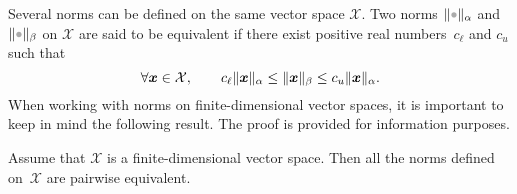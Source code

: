 Several norms can be defined on the same vector space $\mathcal X$.
Two norms $\norm{\placeholder}_{\alpha}$ and $\norm{\placeholder}_{\beta}$ on $\mathcal X$ are said to be equivalent if
there exist positive real numbers~$c_{\ell}$ and $c_u$ such that
\begin{equation}
    \label{eq:norm_equilavence}
    \forall \mathbf{\boldsymbol{x}} \in \mathcal X,
    \qquad c_{\ell} \lVert\mathbf{\boldsymbol{x}}\rVert_{\alpha}
    \leq \lVert\mathbf{\boldsymbol{x}}\rVert_{\beta}
    \leq c_u \lVert\mathbf{\boldsymbol{x}}\rVert_{\alpha}.
\end{equation}
When working with norms on finite-dimensional vector spaces,
it is important to keep in mind the following result.
The proof is provided for information purposes.
\begin{proposition}
    Assume that $\mathcal X$ is a finite-dimensional vector space.
    Then all the norms defined on~$\mathcal X$ are pairwise equivalent.
\end{proposition}
